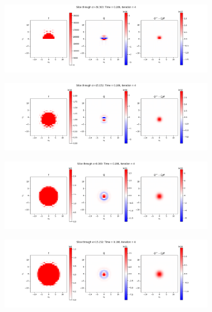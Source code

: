 \documentclass{article}
\begin{document}
\begin{figure}[H]
  \begin{subfigure}[b]{\textwidth}
    \includegraphics[width=\textwidth]{imgs/lf_output2/slice0/mat4.png}
  \end{subfigure}
  \hfill
  \begin{subfigure}[b]{\textwidth}
    \includegraphics[width=\textwidth]{imgs/lf_output2/slice25/mat4.png}
  \end{subfigure}
  \hfill
  \begin{subfigure}[b]{\textwidth}
    \includegraphics[width=\textwidth]{imgs/lf_output2/slice50/mat4.png}
  \end{subfigure}
  \hfill
  \begin{subfigure}[b]{\textwidth}
    \includegraphics[width=\textwidth]{imgs/lf_output2/slice75/mat4.png}
  \end{subfigure}
\end{figure}
\end{document}
